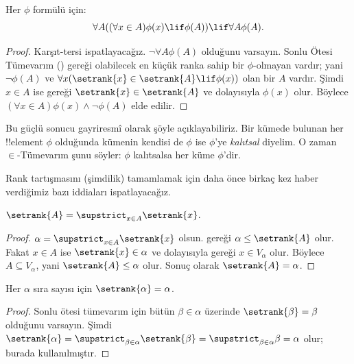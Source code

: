 \documentclass[../../../include/open-logic-section]{subfiles}
\begin{document}
\begin{thm}
Her $\phi$ formülü için:
\[
	\forall A((\forall x \in A)\phi(x) \lif \phi(A)) \lif \forall A \phi(A).
\]
\end{thm}

\begin{proof}
Karşıt-tersi ispatlayacağız. $\lnot\forall A\phi(A)$ olduğunu varsayın.
Sonlu Ötesi Tümevarım
() gereği olabilecek en küçük
ranka sahip bir $\phi$-olmayan vardır; yani $\lnot\phi(A)$ ve
$\forall x(\setrank{x}\in\setrank{A}\lif\phi(x))$ olan bir $A$ vardır.
Şimdi $x\in A$ ise  gereği
$\setrank{x}\in\setrank{A}$ ve dolayısıyla $\phi(x)$ olur. Böylece
$(\forall x\in A)\phi(x)\land\lnot\phi(A)$ elde edilir.
\end{proof}\noindent
Bu güçlü sonucu gayriresmî olarak şöyle açıklayabiliriz. Bir kümede bulunan
her !!{element} $\phi$ olduğunda kümenin kendisi de $\phi$ ise $\phi$'ye
\emph{kalıtsal} diyelim. O zaman $\in$-Tümevarım şunu söyler: $\phi$
kalıtsalsa her küme $\phi$'dir.

Rank tartışmasını (şimdilik) tamamlamak için daha önce birkaç kez haber
verdiğimiz bazı iddiaları ispatlayacağız.

\begin{prop}
$\setrank{A} = \supstrict_{x \in A}\setrank{x}$.
\end{prop}

\begin{proof}
$\alpha=\supstrict_{x\in A}\setrank{x}$ olsun.
 gereği $\alpha\leq\setrank{A}$ olur. Fakat
$x\in A$ ise $\setrank{x}\in\alpha$ ve dolayısıyla
 gereği $x\in V_\alpha$ olur. Böylece
$A\subseteq V_\alpha$, yani $\setrank{A}\leq\alpha$ olur. Sonuç olarak
$\setrank{A}=\alpha$.
\end{proof}

\begin{cor}
Her $\alpha$ sıra sayısı için $\setrank{\alpha}=\alpha$.
\end{cor}

\begin{proof}
Sonlu ötesi tümevarım için bütün $\beta\in\alpha$ üzerinde
$\setrank{\beta}=\beta$ olduğunu varsayın. Şimdi
$\setrank{\alpha}=\supstrict_{\beta\in\alpha}\setrank{\beta}=
\supstrict_{\beta\in\alpha}\beta=\alpha$ olur; burada
 kullanılmıştır.
%
\end{proof}
\end{document}
